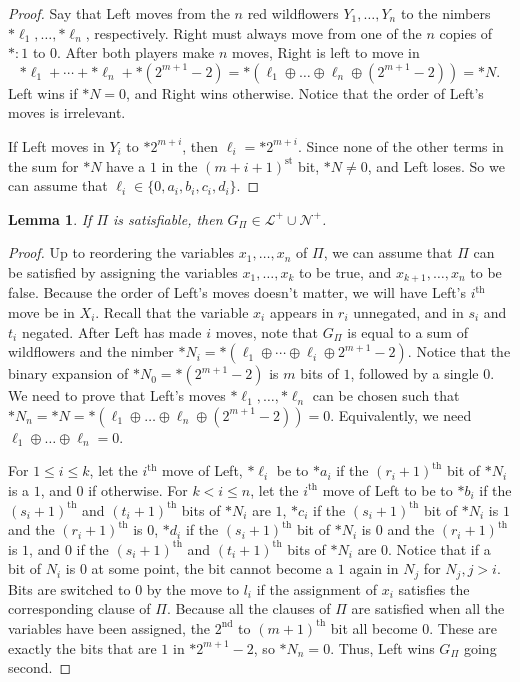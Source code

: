 \documentclass{amsart}
\theoremstyle{plain}
\newtheorem{lemma}[thm]{Lemma}
\theoremstyle{definition}
\theoremstyle{remark}
\numberwithin{equation}{section}
\numberwithin{thm}{section}
\begin{document}
\begin{proof}
     Say that Left moves from the $n$ red wildflowers $Y_1,\ldots,Y_n$ to the nimbers $*\ell_1,\ldots,*\ell_n$, respectively. Right must always move from one of the $n$ copies of $*:1$ to $0$. After both players make $n$ moves, Right is left to move in \begin{equation}
    *\ell_1 + \cdots + *\ell_n +*(2^{m+1}-2)= * (\ell_1 \oplus \dots \oplus \ell_n\oplus( 2^{m+1}-2)) = *N.
\end{equation}
Left wins if $*N =0$, and Right wins otherwise. Notice that the order of Left's moves is irrelevant.

If Left moves in $Y_i$ to $*2^{m+i}$, then $\ell_i = *2^{m+i}$. Since none of the other terms in the sum for $*N$ have a $1$ in the $(m+i+1)^{\text{st}}$ bit, $*N \neq 0$, and Left loses. 
So we can assume that $\ell_i \in \{0,a_i,b_i,c_i,d_i\}$.
\end{proof}
\begin{lemma}
    If $\Pi$ is satisfiable, then $G_{\Pi} \in\mathcal{L}^+ \cup \mathcal{N}^+$.
\end{lemma}
\begin{proof}
    Up to reordering the variables $x_1,\dots,x_n$ of $\Pi$, we can assume that $\Pi$ can be satisfied by assigning the variables $x_1,\dots,x_k$ to be true, and $x_{k+1},\ldots,x_n$ to be false.  Because the order of Left's moves doesn't matter, we will have Left's $i^\text{th}$ move be in $X_i$. Recall that the variable $x_i$ appears in $r_i$ unnegated, and in $s_i$ and $t_i$ negated. After Left has made $i$ moves, note that $G_{\Pi}$ is equal to a sum of wildflowers and the nimber $*N_i = *(\ell_1 \oplus \cdots \oplus \ell_i \oplus 2^{m+1}-2)$. Notice that the binary expansion of $*N_0= *(2^{m+1}-2)$ is $m$ bits of $1$, followed by a single $0$. We need to prove that Left's moves $*\ell_1,\dots,*\ell_n$ can be chosen such that $*N_n = *N = * (\ell_1 \oplus \dots \oplus \ell_n \oplus ( 2^{m+1}-2) )= 0$. Equivalently, we need $\ell_1 \oplus \dots \oplus \ell_n = 0$.

    For $1 \leq i \leq k$, let the $i^\text{th}$ move of Left, $*\ell_i$ be to $*a_i$ if the $(r_i+1)^{\text{th}}$ bit of $*N_i$ is a $1$, and $0$ if otherwise.
For $k < i \leq n$, let the $i^\text{th}$ move of Left to be to $*b_i$ if the $(s_i+1)^{\text{th}}$ and $(t_i+1)^{\text{th}}$ bits of $*N_i$  are $1$, $*c_i$ if the $(s_i+1)^\text{th}$ bit of $*N_i$ is $1$ and the $(r_i+1)^{\text{th}}$ is $0$, $*d_i$ if the $(s_i+1)^\text{th}$ bit of $*N_i$ is $0$ and the $(r_i+1)^{\text{th}}$ is $1$, and $0$ if the $(s_i+1)^{\text{th}}$ and $(t_i+1)^{\text{th}}$ bits of $*N_i$  are $0$. 
Notice that if a bit of $N_i$ is $0$ at some point, the bit cannot become a $1$ again in $N_j $ for $N_j,j>i$. Bits are switched to $0$ by the move to $l_i$ if the assignment of $x_i$ satisfies the corresponding clause of $\Pi$. Because all the clauses of $\Pi$ are satisfied when all the variables have been assigned, the $2^{\text{nd}}$ to $(m+1)^{\text{th}}$ bit all become $0$. These are exactly the bits that are $1$ in $ *2^{m+1}-2$, so $*N_n = 0$. Thus, Left wins $G_{\Pi}$ going second. 
\end{proof}
\end{document}
